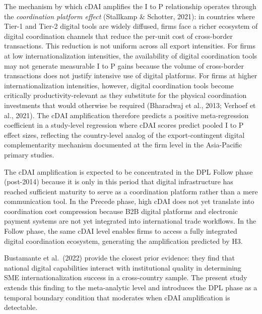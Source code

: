 \documentclass[
  12pt,a4paper]{article}
\begin{document}
The mechanism by which cDAI amplifies the I to P relationship operates
through the \emph{coordination platform effect} (Stallkamp \& Schotter,
2021): in countries where Tier-1 and Tier-2 digital tools are widely
diffused, firms face a richer ecosystem of digital coordination channels
that reduce the per-unit cost of cross-border transactions. This
reduction is not uniform across all export intensities. For firms at low
internationalization intensities, the availability of digital
coordination tools may not generate measurable I to P gains because the
volume of cross-border transactions does not justify intensive use of
digital platforms. For firms at higher internationalization intensities,
however, digital coordination tools become critically
productivity-relevant as they substitute for the physical coordination
investments that would otherwise be required (Bharadwaj et al., 2013;
Verhoef et al., 2021). The cDAI amplification therefore predicts a
positive meta-regression coefficient in a study-level regression where
cDAI scores predict pooled I to P effect sizes, reflecting the
country-level analog of the export-contingent digital complementarity
mechanism documented at the firm level in the Asia-Pacific primary
studies.

The cDAI amplification is expected to be concentrated in the DPL Follow
phase (post-2014) because it is only in this period that digital
infrastructure has reached sufficient maturity to serve as a
coordination platform rather than a mere communication tool. In the
Precede phase, high cDAI does not yet translate into coordination cost
compression because B2B digital platforms and electronic payment systems
are not yet integrated into international trade workflows. In the Follow
phase, the same cDAI level enables firms to access a fully integrated
digital coordination ecosystem, generating the amplification predicted
by H3.

Bustamante et al.~(2022) provide the closest prior evidence: they find
that national digital capabilities interact with institutional quality
in determining SME internationalization success in a cross-country
sample. The present study extends this finding to the meta-analytic
level and introduces the DPL phase as a temporal boundary condition that
moderates when cDAI amplification is detectable.
\end{document}
